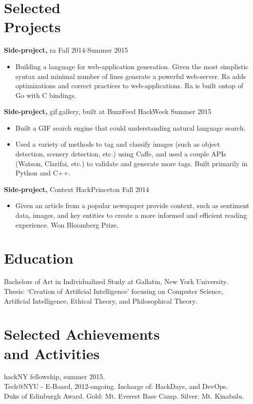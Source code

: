 \documentclass[margin]{res}
\begin{document}
\begin{resume}
\section{Selected \\ Projects}
{\bf Side-project,} ra \hfill Fall 2014-Summer 2015
\begin{itemize} \itemsep -2pt
\item Building a language for web-application generation. Given the most simplistic syntax and minimal number of lines generate a powerful web-server. Ra adds optimizations and correct practices to web-applications. Ra is built ontop of Go with C bindings.
\end{itemize}

{\bf Side-project,} gif.gallery, built at BuzzFeed HackWeek \hfill Summer 2015
\begin{itemize} \itemsep -2pt
\item Built a GIF search engine that could understanding natural language search. 
\item Used a variety of methods to tag and classify images (such as object detection, scenery detection, etc.) using Caffe, and used a couple APIs (Watson, Clarifai, etc.) to validate and generate more tags. Built primarily in Python and C++.
\end{itemize}

{\bf Side-project,} Context \hfill HackPrinceton Fall 2014
\begin{itemize} \itemsep -2pt 
\item Given an article from a popular newspaper provide context, such as sentiment data, images, and key entities to create a more informed and efficient reading experience. Won Bloomberg Prize.
\end{itemize}

\section{Education} 
Bachelors of Art in Individualized Study at Gallatin, New York University. \\
Thesis: `Creation of Artificial Intelligence' focusing on Computer Science, Artificial Intelligence, Ethical Theory, and Philosophical Theory.

\section{Selected Achievements \\ and Activities} 
hackNY fellowship, summer 2015. \\
Tech@NYU - E-Board, 2012-ongoing. Incharge of: HackDays, and DevOps. \\
Duke of Edinburgh Award. Gold: Mt. Everest Base Camp. Silver: Mt. Kinabalu.

\end{resume} 
\end{document}
